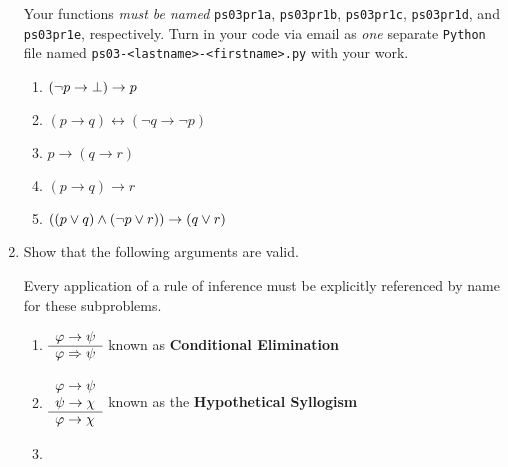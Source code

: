\begin{enumerate}
        Your functions \emph{must be named}
        \texttt{ps03pr1a},
        \texttt{ps03pr1b},
        \texttt{ps03pr1c},
        \texttt{ps03pr1d},
        and \texttt{ps03pr1e}, respectively.
        Turn in your code via email as \emph{one} separate \texttt{Python} file
        named \texttt{ps03-<lastname>-<firstname>.py}
        with your work.
        \begin{enumerate}
            \item
                \(\pn*{\neg p \rightarrow \bot} \rightarrow p\)
            \item
                \((p \rightarrow q) \leftrightarrow (\neg q \rightarrow \neg p)\)
            \item
                \(p \rightarrow (q \rightarrow r)\)
            \item
                \((p \rightarrow q) \rightarrow r\)
            \item
                \(\pn*{(p \join q) \meet (\neg p \join r)} \rightarrow (q \join r)\)
        \end{enumerate}
    \item
        Show that the following arguments are valid.
        \begin{remark}
            Every application of a rule of inference must be explicitly referenced by name for these subproblems.
        \end{remark}
        \begin{enumerate}
            \item
                \(
                    \begin{array}{l}
                        \varphi \rightarrow \psi \\
                        \cline{1-1}
                        \varphi \implies \psi
                    \end{array}
                \)
                \hfill known as \textbf{Conditional Elimination}
            \item
                \(
                    \begin{array}{l}
                        \varphi \rightarrow \psi \\
                        \psi \rightarrow \chi \\
                        \cline{1-1}
                        \varphi \rightarrow \chi
                    \end{array}
                \)
                \hfill known as the \textbf{Hypothetical Syllogism}
            \item

\end{enumerate}
\end{enumerate}

